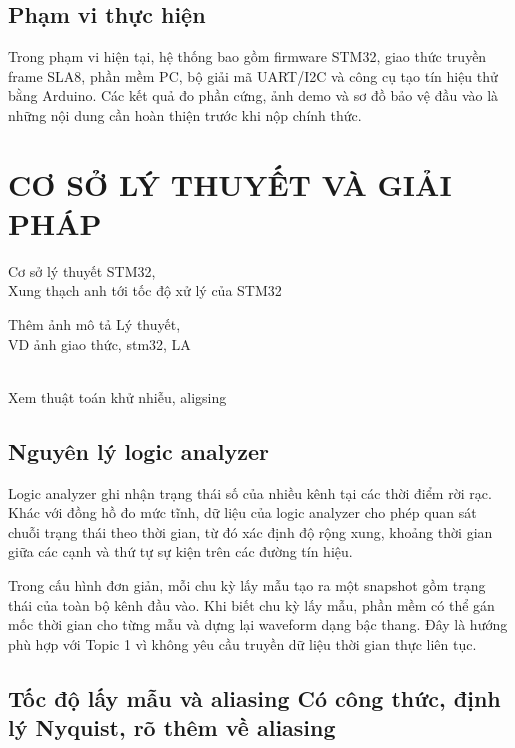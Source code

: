 \section{Phạm vi thực hiện}\label{phux1ea1m-vi-thux1ef1c-hiux1ec7n}

Trong phạm vi hiện tại, hệ thống bao gồm firmware STM32, giao thức truyền frame SLA8, phần mềm PC, bộ giải mã UART/I2C và công cụ tạo tín hiệu thử bằng Arduino. Các kết quả đo phần cứng, ảnh demo và sơ đồ bảo vệ đầu vào là những nội dung cần hoàn thiện trước khi nộp chính thức.

\chapter{CƠ SỞ LÝ THUYẾT VÀ GIẢI PHÁP}\label{cux1a1-sux1edf-luxfd-thuyux1ebft-vuxe0-giux1ea3i-phuxe1p}

Cơ sở lý thuyết STM32,\\
Xung thạch anh tới tốc độ xử lý của STM32

Thêm ảnh mô tả Lý thuyết,\\
VD ảnh giao thức, stm32, LA\\
\strut \\
Xem thuật toán khử nhiễu, aligsing

\section{Nguyên lý logic analyzer}\label{nguyuxean-luxfd-logic-analyzer}

Logic analyzer ghi nhận trạng thái số của nhiều kênh tại các thời điểm rời rạc. Khác với đồng hồ đo mức tĩnh, dữ liệu của logic analyzer cho phép quan sát chuỗi trạng thái theo thời gian, từ đó xác định độ rộng xung, khoảng thời gian giữa các cạnh và thứ tự sự kiện trên các đường tín hiệu.

Trong cấu hình đơn giản, mỗi chu kỳ lấy mẫu tạo ra một snapshot gồm trạng thái của toàn bộ kênh đầu vào. Khi biết chu kỳ lấy mẫu, phần mềm có thể gán mốc thời gian cho từng mẫu và dựng lại waveform dạng bậc thang. Đây là hướng phù hợp với Topic 1 vì không yêu cầu truyền dữ liệu thời gian thực liên tục.

\section{Tốc độ lấy mẫu và aliasing Có công thức, định lý Nyquist, rõ thêm về aliasing}\label{tux1ed1c-ux111ux1ed9-lux1ea5y-mux1eabu-vuxe0-aliasing-cuxf3-cuxf4ng-thux1ee9c-ux111ux1ecbnh-luxfd-nyquist-ruxf5-thuxeam-vux1ec1-aliasing}

